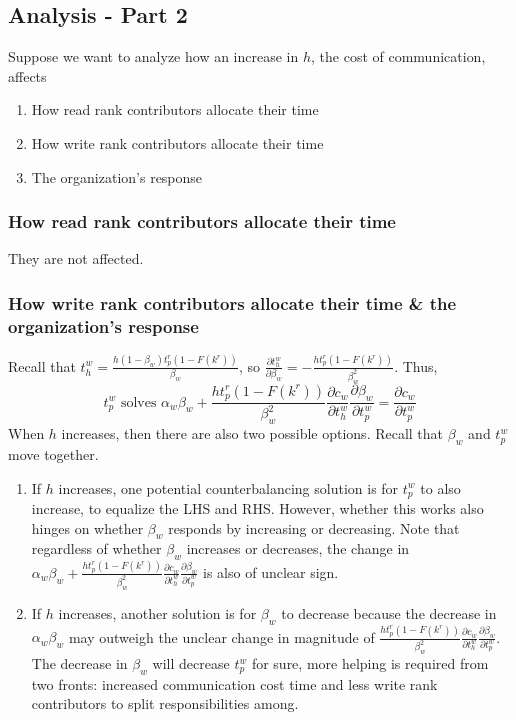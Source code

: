 \documentclass[source/paper/main.tex]{subfiles}
\begin{document}
\subsection{Analysis - Part 2}
Suppose we want to analyze how an increase in $h$, the cost of communication, affects
\begin{enumerate}
    \item How read rank contributors allocate their time
    \item How write rank contributors allocate their time
    \item The organization's response
\end{enumerate}
\subsubsection{How read rank contributors allocate their time}
They are not affected. 
\subsubsection{How write rank contributors allocate their time \& the organization's response}
Recall that $t_h^w = \frac{ h (1-\beta_w) t_p^r(1-F(k^r))}{\beta_w}$, so $\frac{\partial t_h^w}{\partial \beta_w} = -\frac{h t_p^r(1-F(k^r))}{\beta_w^2}$. Thus,
$$t_p^w \text{ solves } \alpha_w \beta_w + \frac{h t_p^r(1-F(k^r))}{\beta_w^2} \frac{\partial c_w}{\partial t_h^w} \frac{\partial \beta_w}{\partial t_p^w} = \frac{\partial c_w}{\partial t_p^w} $$
When $h$ increases, then there are also two possible options. Recall that $\beta_w$ and $t_p^w$ move together. 
\begin{enumerate}
    \item If $h$ increases, one potential counterbalancing solution is for $t_p^w$ to also increase, to equalize the LHS and RHS. However, whether this works also hinges on whether $\beta_w$ responds by increasing or decreasing. Note that regardless of whether $\beta_w$ increases or decreases, the change in $\alpha_w \beta_w + \frac{h t_p^r(1-F(k^r))}{\beta_w^2} \frac{\partial c_w}{\partial t_h^w} \frac{\partial \beta_w}{\partial t_p^w}$ is also of unclear sign. 
    
    \item If $h$ increases, another solution is for $\beta_w$ to decrease because the decrease in $\alpha_w\beta_w$ may outweigh the unclear change in magnitude of $\frac{h t_p^r(1-F(k^r))}{\beta_w^2} \frac{\partial c_w}{\partial t_h^w} \frac{\partial \beta_w}{\partial t_p^w}$. The decrease in $\beta_w$ will decrease $t_p^w$ for sure, more helping is required from two fronts: increased communication cost time and less write rank contributors to split responsibilities among. 
\end{enumerate}
\end{document}
